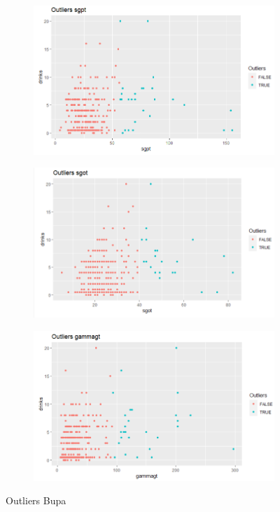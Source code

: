 \begin{figure}[!tbh]
	\begin{subfigure}{0.5\textwidth}
	\includegraphics[width=1\linewidth]{figures/outlier_5}
\caption{}
\label{fig:outlier5}
	\end{subfigure}\hfil %
	\begin{subfigure}{0.5\textwidth}
	\includegraphics[width=1\linewidth]{figures/outlier_6}
\caption{}
\label{fig:outlier6}
	\end{subfigure}\hfil %
	
	\medskip
	\begin{subfigure}{0.5\textwidth}
		\centering
	\includegraphics[width=1\linewidth]{figures/outlier_7}
\caption{}
\label{fig:outlier7}
	\end{subfigure}\hfil %
	
	\caption{Outliers Bupa}
	\label{out}
\end{figure}

